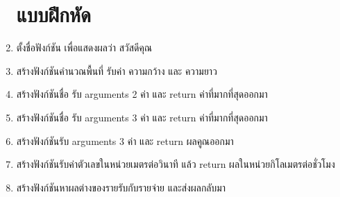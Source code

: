 \begin{enumerate} 

\section{แบบฝึกหัด}

\item ตั้งชื่อฟังก์ชัน  เพื่อแสดงผลว่า สวัสดีคุณ
\item สร้างฟังก์ชันคำนวณพื้นที่ รับค่า ความกว้าง และ ความยาว
\item สร้างฟังก์ชันชื่อ   รับ arguments 2 ค่า และ return ค่าที่มากที่สุดออกมา
\item สร้างฟังก์ชันชื่อ   รับ arguments 3 ค่า และ return ค่าที่มากที่สุดออกมา
\item สร้างฟังก์ชันรับ arguments 3 ค่า และ return ผลคูณออกมา
\item สร้างฟังก์ชันรับค่าตัวเลขในหน่วยเมตรต่อวินาที แล้ว return ผลในหน่วยกิโลเมตรต่อชั่วโมง
\item สร้างฟังก์ชันหาผลต่างของรายรับกับรายจ่าย และส่งผลกลับมา

\end{enumerate}


